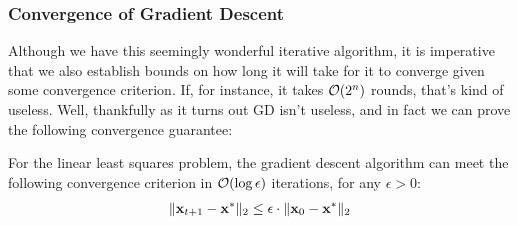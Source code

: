     \subsubsection{Convergence of Gradient Descent}
    Although we have this seemingly wonderful iterative algorithm, it is imperative that we also establish bounds on how long it will take for it to converge given some convergence criterion. If, for instance, it takes $\mathcal{O}(2^n)$ rounds, that's kind of useless. Well, thankfully as it turns out GD isn't useless, and in fact we can prove the following convergence guarantee:
\begin{mdframed}
    \begin{theorem}
        For the linear least squares problem, the gradient descent algorithm can meet the following convergence criterion in $\mathcal{O}(\log \epsilon)$ iterations, for any $\epsilon > 0$:
        \begin{align*}
            \lVert \mathbf{x}_{t+1} - \mathbf{x}^* \rVert_2 \leq \epsilon \cdot \lVert \mathbf{x}_0 - \mathbf{x}^* \rVert_2
        \end{align*}
    \end{theorem}
\end{mdframed}    

